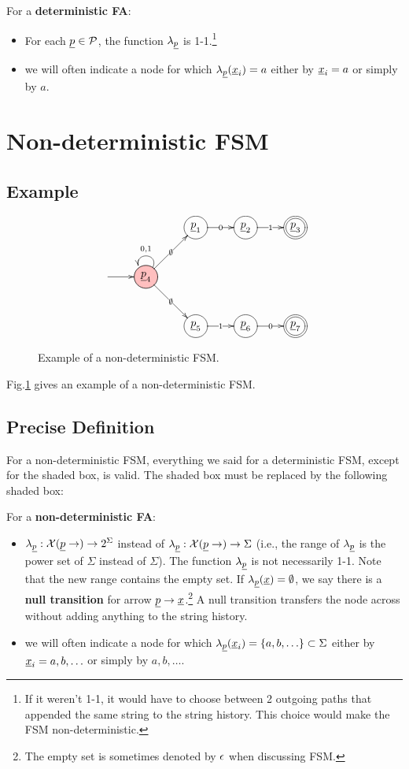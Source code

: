 \begin{mdframed}[hidealllines=true,backgroundcolor=blue!10]
For a {\bf deterministic FA}:
\begin{itemize}
\item For each $\rvp\in\calp$, the function  $\lam_\rvp$ is 1-1.\footnote{If it weren't 1-1,
it would have to choose 
between 2 outgoing paths
that appended the same string to the string history.
This choice would make
the FSM non-deterministic.}

\item
we will often indicate a node for 
which $\lam_{\rvp}(\rvx_i)=a$ either by $\rvx_i=a$
or simply by $a$. 
\end{itemize}\end{mdframed}

\section{Non-deterministic FSM}
\subsection{Example}

\begin{figure}
$$
\xymatrix{
&&\Circle{\rvp_1}\ar[r]|0
&\Circle{\rvp_2}\ar[r]|1
&\DCircle{\rvp_3}
\\
\ar[r]
&\PinkCircle{\rvp_4}\ar@(ru,lu)[]_{0,1}
\ar[ru]|\emptyset
\ar[rd]|\emptyset
\\
&&\Circle{\rvp_5}\ar[r]|1
&\Circle{\rvp_6}\ar[r]|0
&\DCircle{\rvp_7}
}
$$
\caption{
Example of a 
non-deterministic FSM.}
\label{fig-non-det-fsm}
\end{figure}
Fig.\ref{fig-non-det-fsm}
gives an example of a non-deterministic
FSM.


\subsection{Precise Definition}
For a non-deterministic FSM,
everything we said for a deterministic FSM,
except for the shaded box, is valid. The shaded 
box must be replaced by the following shaded box:

\begin{mdframed}[hidealllines=true,backgroundcolor=blue!10]
For a {\bf non-deterministic FA}:
\begin{itemize}
\item
$\lam_\rvp:\calx(\rvp\rarrow)\rarrow 2^\Sigma$ 
instead of 
$\lam_\rvp:\calx(\rvp\rarrow)\rarrow \Sigma$ (i.e., the range of $\lam_\rvp$
is the power set of $\Sigma$ 
instead of $\Sigma$).
The function $\lam_\rvp$ is not necessarily
1-1.
Note that the new range contains the empty set.
If $\lam_\rvp(\rvx)=\emptyset$, we say there is a  {\bf null transition} for arrow 
$\rvp\rarrow \rvx$.\footnote{The empty set is sometimes denoted by $\epsilon$ 
when discussing FSM.} A null transition 
transfers the node across without adding anything to the string history. 
\item
we will often indicate a node for 
which $\lam_{\rvp}(\rvx_i)=\{a,b, \ldots\}\subset\Sigma$ either by $\rvx_i=a, b, \ldots$
or simply by $a, b, \ldots$. 
\end{itemize}\end{mdframed}


